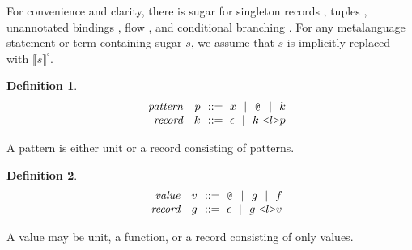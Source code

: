 \documentclass[table,dvipsnames,acmsmall]{acmart}
\theoremstyle{definition}
\newtheorem{definition}{Definition}[section]
\begin{document}
\noindent
For convenience and clarity, there is sugar for 
singleton records ,
tuples , 
unannotated bindings , flow ,
and conditional branching .
For any metalanguage statement or term containing sugar $s$, we assume that $s$ is implicitly replaced with $\llbracket s \rrbracket^\square$.

\begin{definition}
  \label{def:pattern}
  \small
  \nopad
  \[\begin{array}[t]{rr@{}l}
    \com{pattern} &
    \nonterm{p} & \is 
      x \sep
      \J{@} \sep
      k
    \\
    \com{record} &
    \nonterm{k} & \is \epsilon \sep k\ \J{<}l\J{>}p
  \end{array}\]
\end{definition}

\noindent
A pattern is either unit or a record consisting of patterns.

\begin{definition}
  \label{def:value}
  \small
  \nopad
  \[\begin{array}[t]{rr@{}l}
    \com{value} &
    \nonterm{v} & \is 
      \J{@} \sep
      g \sep
      f
    \\
    \com{record} &
    \nonterm{g} & \is \epsilon \sep g\ \J{<}l\J{>}v
  \end{array}\]
\end{definition}

\noindent
A value may be unit, a function, or a record consisting of only values. 
\end{document}
